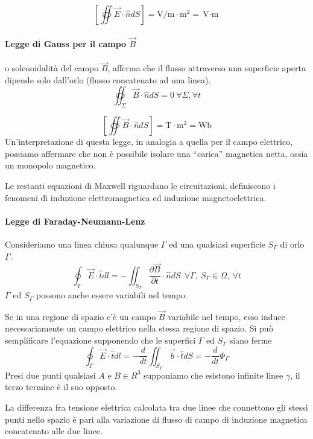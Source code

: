 $$
\left[\oiint \vec{E}\cdot\hat{n}dS\right] = \si{\volt\per\meter\cdot\meter^2} = \si{\volt\cdot\meter}
$$

\paragraph{Legge di Gauss per il campo $\vec{B}$} o solenoidalità del campo $\vec{B}$,
afferma che il flusso attraverso una superficie aperta dipende solo dall'orlo (flusso concatenato ad una
linea).
\begin{equation}
\oiint_{\Sigma} \vec{B}\cdot\hat{n}dS = 0\ \forall \Sigma, \forall t
\end{equation}

$$
\left[\oiint \vec{B}\cdot\hat{n}dS\right] = \si{\tesla\cdot\meter^2} = \si{\weber}
$$
Un'interpretazione di questa legge, in analogia a quella per il campo elettrico, possiamo affermare
che non è possibile isolare una ``carica'' magnetica netta, ossia un monopolo magnetico.

Le restanti equazioni di Maxwell riguardano le circuitazioni, definiscono i fenomeni di induzione
elettromagnetica ed induzione magnetoelettrica.

\paragraph{Legge di Faraday-Neumann-Lenz}
Consideriamo una linea chiusa qualunque $\Gamma$ ed una qualsiasi superficie $S_\Gamma$ di
orlo $\Gamma$.
\begin{equation}
\oint_{\Gamma} \vec{E}\cdot\hat{t}dl = - \iint_{S_\Gamma} \frac{\partial \vec{B}}{\partial t}
\cdot\hat{n} dS\ \ \forall\Gamma,\ S_\Gamma\in\Omega,\ \forall t
\end{equation}
$\Gamma$ ed $S_\Gamma$ possono anche essere variabili nel tempo.

Se in una regione di spazio c'è un campo $\vec{B}$ variabile nel tempo, esso induce necessariamente
un campo elettrico nella stessa regione di spazio.
Si può semplificare l'equazione supponendo che le superfici $\Gamma$ ed $S_\Gamma$ siano ferme
$$
\oint_{\Gamma} \vec{E}\cdot\hat{t}dl = -\frac{d}{dt} \iint_{S_\Gamma}\vec{b}\cdot\hat{t}dS = 
-\frac{d}{dt} \Phi_\Gamma
$$
Presi due punti qualsiasi $A$ e $B \in R^3$ supponiamo che esistono infinite linee $\gamma$, il terzo 
termine è il suo opposto.

La differenza fra tensione elettrica calcolata tra due linee che connettono gli stessi punti nello 
spazio è pari alla variazione di flusso di campo di induzione magnetica concatenato alle due linee.

